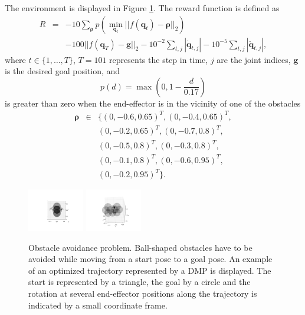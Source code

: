 \documentclass{article}
\begin{document}
The environment is displayed in Figure \ref{fig:obstacle_env}. The reward
function is defined as
\begin{eqnarray*}
R &=& - 10 \sum_{\boldsymbol{\rho}} p\left(\min_{\boldsymbol{q}_t} ||f(\boldsymbol{q}_t) - \boldsymbol{\rho}||_2\right)\\
&&- 100 ||f(\boldsymbol{q}_T) - \boldsymbol{g}||_2
  - 10^{-2} \sum_{t,j} |\dot{\boldsymbol{q}}_{t,j}|
  - 10^{-5} \sum_{t,j} |\ddot{\boldsymbol{q}}_{t,j}|,
\end{eqnarray*}
where $t \in \lbrace 1, \ldots, T \rbrace$, $T=101$ represents the step in time,
$j$ are the joint indices, $\boldsymbol{g}$ is the desired goal position,
and $$p(d) = \max(0, 1 - \frac{d}{0.17})$$ is greater than zero when the
end-effector is in the vicinity of one of the obstacles
\begin{eqnarray*}
\boldsymbol{\rho} &\in& \lbrace (0, -0.6, 0.65)^T, (0, -0.4, 0.65)^T,\\
&& (0, -0.2, 0.65)^T, (0, -0.7, 0.8)^T,\\
&& (0, -0.5, 0.8)^T, (0, -0.3, 0.8)^T,\\
&& (0, -0.1, 0.8)^T, (0, -0.6, 0.95)^T,\\
&& (0, -0.2, 0.95)^T \rbrace.
\end{eqnarray*}


\begin{figure}[tb]
\includegraphics[width=0.22\textwidth,clip=true,trim=200 80 155 120]{obstacles1}
\includegraphics[width=0.22\textwidth,clip=true,trim=165 35 140 100]{obstacles2}
\centering
\caption{
Obstacle avoidance problem.
Ball-shaped obstacles have to be avoided while moving from a start pose to a
goal pose.
An example of an optimized trajectory represented by a DMP is displayed.
The start is represented by a triangle, the goal by a circle and the rotation
at several end-effector positions along the trajectory is indicated by a
small coordinate frame.
}
\label{fig:obstacle_env}
\end{figure}
\end{document}
